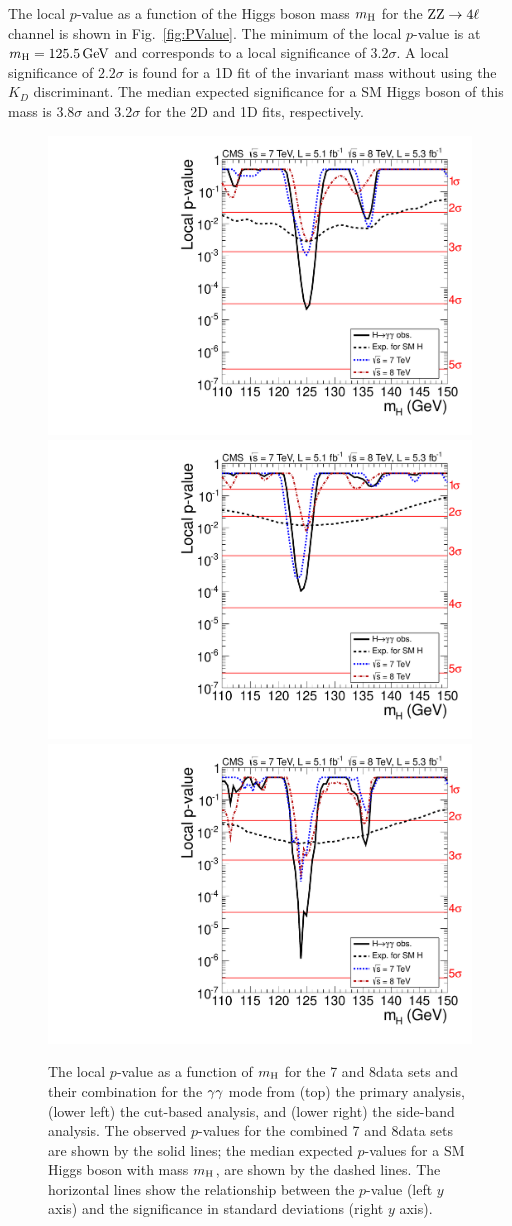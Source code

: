 \documentclass[11pt,twoside,a4paper,cmspaper,final,collab]{cms-tdr}
\begin{document}
The local $p$-value as a function of the Higgs boson mass $m_{\mathrm{H}}$
for the $\mathrm{Z}\mathrm{Z}   \rightarrow 4\ell$ channel
is shown in Fig.~\ref{fig:PValue}.
The minimum of the local $p$-value is at $m_{\mathrm{H}}=125.5\,\text{Ge\hspace{-.08em}V}$ and
corresponds to a local significance of $3.2\sigma$.
A local significance of $2.2\sigma$ is found for a  1D fit of the invariant mass without using the $K_{D}$ discriminant.
The median expected significance for a SM Higgs boson of this mass
is $3.8\sigma$ and 3.2$\sigma$ for the 2D and 1D fits, respectively.



\begin{figure}[htbp]
    \begin{center}
      \includegraphics[width=0.49\linewidth]{figures/hgg_MassFactPValue}  \\
      \includegraphics[width=0.49\linewidth]{figures/hgg_BaselinePValue}
      \includegraphics[width=0.49\linewidth]{figures/hgg_MassWindowPValue}
     \caption{The local $p$-value as a function of $m_{\mathrm{H}}$ for the 7 and 8\TeV data sets and their combination
      for the  $\gamma\gamma$ mode from
      (top) the primary analysis,
     (lower left) the cut-based analysis, and (lower right) the side-band analysis.
     The observed $p$-values for the combined 7 and 8\TeV data sets  are shown by the solid lines;
     the median expected $p$-values for a SM Higgs boson with mass $m_{\mathrm{H}}$, are shown by the dashed lines.
     The horizontal lines show the relationship between the $p$-value
     (left $y$ axis) and
     the significance in standard deviations (right $y$ axis).
       }
      \label{fig:PValueGaGa}
    \end{center}
\end{figure}
\end{document}
